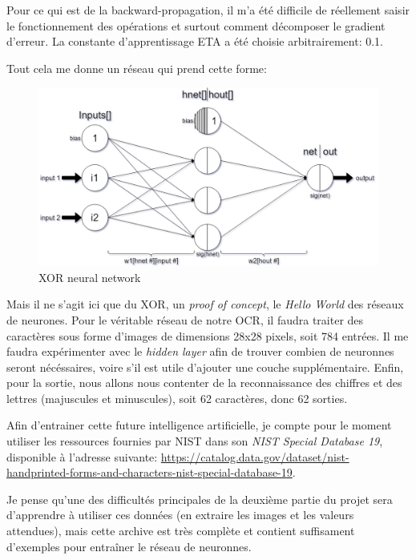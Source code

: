 \documentclass[12pt]{report}
\begin{document}
Pour ce qui est de la backward-propagation, il m'a été difficile de réellement saisir le fonctionnement des opérations et surtout comment décomposer le gradient d'erreur. La constante d'apprentissage ETA a été choisie arbitrairement: 0.1. 

Tout cela me donne un réseau qui prend cette forme:

\begin{figure}[H]
    \centering
    \includegraphics[width=1\textwidth]{XOR_Neural_Network}
    \caption{XOR neural network}
\end{figure}

Mais il ne s'agit ici que du XOR, un \textit{proof of concept}, le \textit{Hello World} des réseaux de neurones. Pour le véritable réseau de notre OCR, il faudra traiter des caractères sous forme d'images de dimensions 28x28 pixels, soit 784 entrées. Il me faudra expérimenter avec le \textit{hidden layer} afin de trouver combien de neuronnes seront nécéssaires, voire s'il est utile d'ajouter une couche supplémentaire. Enfin, pour la sortie, nous allons nous contenter de la reconnaissance des chiffres et des lettres (majuscules et minuscules), soit 62 caractères, donc 62 sorties.

Afin d'entrainer cette future intelligence artificielle, je compte pour le moment utiliser les ressources fournies par NIST dans son \textit{NIST Special Database 19}, disponible à l'adresse suivante: \url{https://catalog.data.gov/dataset/nist-handprinted-forms-and-characters-nist-special-database-19}. 

Je pense qu'une des difficultés principales de la deuxième partie du projet sera d'apprendre à utiliser ces données (en extraire les images et les valeurs attendues), mais cette archive est très complète et contient suffisament d'exemples pour entraîner le réseau de neuronnes.
\end{document}
